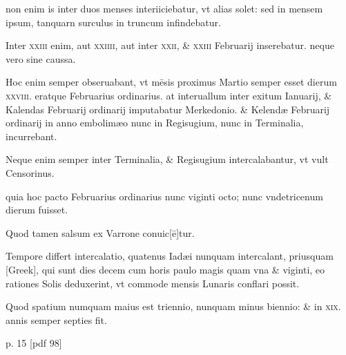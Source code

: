 \begin{parnumbers}
non enim is inter duos
menses interiiciebatur, vt alias solet: sed in mensem ipsum, tanquarn
surculus in truncum infindebatur.

Inter \textsc{xxiii} enim, aut \textsc{xxiiii},
aut inter \textsc{xxii}, \& \textsc{xxiii} Februarij inserebatur.
neque vero sine caussa.

Hoc enim semper obseruabant, vt mēsis proximus Martio semper esset
dierum \textsc{xxviii}.
eratque Februarius ordinarius. at interuallum inter exitum
Ianuarij, \& Kalendas Februarij ordinarij imputabatur Merkedonio.
\& Kelendæ Februarij ordinarij in anno embolimæo nunc in Regisugium,
nunc in Terminalia, incurrebant.

Neque enim semper inter
Terminalia, \& Regisugium intercalabantur, vt vult Censorinus.

quia hoc pacto Februarius ordinarius nunc viginti octo; nunc vndetricenum
dierum fuisset.

Quod tamen salsum ex Varrone conuic[ē]tur.

Tempore differt intercalatio, quatenus Iadæi nunquam intercalant,
priusquam \textgreek{[Greek]}, qui sunt dies decem cum horis paulo
magis quam vna \& viginti, eo rationes Solis deduxerint, vt commode
mensis Lunaris conflari possit.

Quod spatium numquam maius est
triennio, nunquam minus biennio: \& in \textsc{xix}. annis semper septies fit.

\end{parnumbers}
\clearpage
p. 15 [pdf 98]
